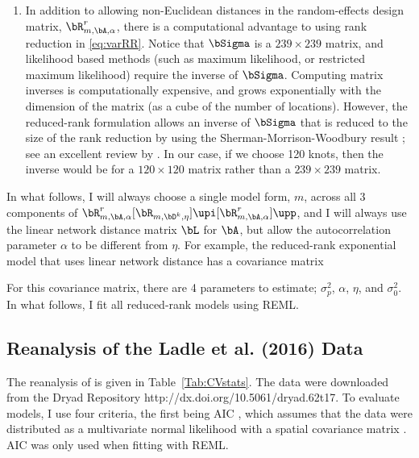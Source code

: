 \begin{enumerate}
		\item In addition to allowing non-Euclidean distances in the random-effects design matrix, $\bR^r_{m,\bA,\alpha}$, there is a computational advantage to using rank reduction in \ref{eq:varRR}.  Notice that $\bSigma$ is a $239 \times 239$ matrix, and likelihood based methods (such as maximum likelihood, or restricted maximum likelihood) require the inverse of $\bSigma$.  Computing matrix inverses is computationally expensive, and grows exponentially with the dimension of the matrix (as a cube of the number of locations).  However, the reduced-rank formulation allows an inverse of $\bSigma$ that is reduced to the size of the rank reduction by using the Sherman-Morrison-Woodbury result \citep{Sher:Morr:adju:1949,Wood:inve:1950}; see an excellent review by \citet{Hend:Sear:on:1981}. In our case, if we choose 120 knots, then the inverse would be for a $120 \times 120$ matrix rather than a $239 \times 239$ matrix.
		
\end{enumerate}

In what follows, I will always choose a single model form, $m$, across all 3 components of $\bR^r_{m,\bA,\alpha}[\bR_{m,\bD^k,\eta}]\upi[\bR^r_{m,\bA,\alpha}]\upp$, and I will always use the linear network distance matrix $\bL$ for $\bA$, but allow the autocorrelation parameter $\alpha$ to be different from $\eta$.  For example, the reduced-rank exponential model that uses linear network distance has a covariance matrix

For this covariance matrix, there are 4 parameters to estimate; $\sigma^2_p$, $\alpha$, $\eta$, and $\sigma^2_0$.  In what follows, I fit all reduced-rank models using REML.

\subsection*{Reanalysis of the Ladle et al. (2016) Data}

The reanalysis of \citet{Ladl:Avga:Whea:Boyc:pred:2016} is given in Table~\ref{Tab:CVstats}. The data were downloaded from the Dryad Repository http://dx.doi.org/10.5061/dryad.62t17.  To evaluate models, I use four criteria, the first being AIC \citep{Akai:Info:1973,Burn:Ande:mode:2002}, which assumes that the data were distributed as a multivariate normal likelihood with a spatial covariance matrix \citep[for an example using spatial models, see][]{Hoet:Davi:Mert:Thom:mode:2006}.  AIC was only used when fitting with REML.   

